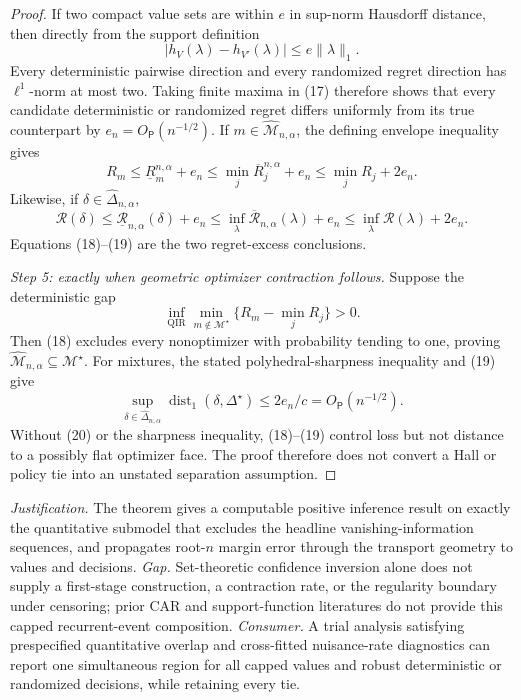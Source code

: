 \documentclass{article}
\begin{document}
\begin{proof}
If two compact value sets are within \(e\) in sup-norm Hausdorff distance, then directly from the support definition
\[
 |h_V(\lambda)-h_{V'}(\lambda)|
 \le e\lVert\lambda\rVert_1.                             \tag{17}
\]
Every deterministic pairwise direction and every randomized regret direction has \(\ell^1\)-norm at most two.  Taking finite maxima in (17) therefore shows that every candidate deterministic or randomized regret differs uniformly from its true counterpart by
\(e_n=O_{\mathsf P}(n^{-1/2})\).  If
\(m\in\widehat{\mathcal M}_{n,\alpha}\), the defining envelope inequality gives
\[
 R_m\le\underline R_m^{n,\alpha}+e_n
 \le\min_j\overline R_j^{n,\alpha}+e_n
 \le\min_jR_j+2e_n.                                     \tag{18}
\]
Likewise, if \(\delta\in\widehat\Delta_{n,\alpha}\),
\[
 \mathcal R(\delta)
 \le\underline{\mathcal R}_{n,\alpha}(\delta)+e_n
 \le\inf_\lambda\overline{\mathcal R}_{n,\alpha}(\lambda)+e_n
 \le\inf_\lambda\mathcal R(\lambda)+2e_n.               \tag{19}
\]
Equations (18)--(19) are the two regret-excess conclusions.

\emph{Step 5: exactly when geometric optimizer contraction follows.}
Suppose the deterministic gap
\[
 \inf_{\operatorname{QIR}}
 \min_{m\notin\mathcal M^\star}
 \{R_m-\min_jR_j\}>0.                                   \tag{20}
\]
Then (18) excludes every nonoptimizer with probability tending to one, proving
\(\widehat{\mathcal M}_{n,\alpha}\subseteq\mathcal M^\star\).  For mixtures, the stated polyhedral-sharpness inequality and (19) give
\[
 \sup_{\delta\in\widehat\Delta_{n,\alpha}}
 \operatorname{dist}_1(\delta,\Delta^\star)
 \le 2e_n/c=O_{\mathsf P}(n^{-1/2}).                      \tag{21}
\]
Without (20) or the sharpness inequality, (18)--(19) control loss but not distance to a possibly flat optimizer face.  The proof therefore does not convert a Hall or policy tie into an unstated separation assumption.
\end{proof}
\par\smallskip\noindent \textit{Justification.} The theorem gives a computable positive inference result on exactly the quantitative submodel that excludes the headline vanishing-information sequences, and propagates root-\(n\) margin error through the transport geometry to values and decisions. \textit{Gap.} Set-theoretic confidence inversion alone does not supply a first-stage construction, a contraction rate, or the regularity boundary under censoring; prior CAR and support-function literatures do not provide this capped recurrent-event composition. \textit{Consumer.} A trial analysis satisfying prespecified quantitative overlap and cross-fitted nuisance-rate diagnostics can report one simultaneous region for all capped values and robust deterministic or randomized decisions, while retaining every tie.
\end{document}
